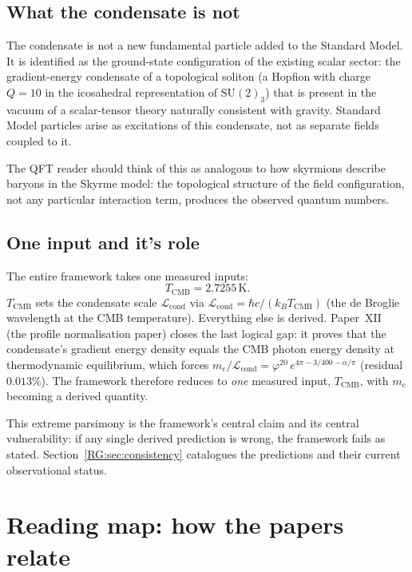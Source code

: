 \documentclass[11pt,a4paper]{article}
\newcommand{\vp}{\varphi}
\newcommand{\TCMB}{T_{\mathrm{CMB}}}
\begin{document}
\subsection{What the condensate is not}

The condensate is not a new fundamental particle added to the Standard Model.
It is identified as the ground-state configuration of the existing scalar sector:
the gradient-energy condensate of a topological soliton (a Hopfion with charge
$Q=10$ in the icosahedral representation of $\mathrm{SU}(2)_3$) that is present
in the vacuum of a scalar-tensor theory naturally consistent with gravity.
Standard Model particles arise as
excitations of this condensate, not as separate fields coupled to it.

The QFT reader should think of this as analogous to how skyrmions describe
baryons in the Skyrme model: the topological structure of the field configuration,
not any particular interaction term, produces the observed quantum numbers.

\subsection{One input and it's role}

The entire framework takes one measured inputs:
\begin{equation}
  \TCMB = 2.7255\,\text{K}.
\end{equation}
$\TCMB$ sets the condensate scale $\mathcal{L}_{\mathrm{cond}}$ via
$\mathcal{L}_{\mathrm{cond}} = \hbar c / (k_B \TCMB)$ (the de Broglie
wavelength at the CMB temperature).
Everything else is derived.
Paper~XII~\cite{Paper12} (the profile normalisation paper) closes the last logical gap:
it proves that the condensate's gradient energy density equals the CMB
photon energy density at thermodynamic equilibrium, which forces
$m_e/\mathcal{L}_{\mathrm{cond}} = \vp^{20}\,e^{4\pi-3/400 -\alpha/\pi}$
(residual $0.013\%$).
The framework therefore reduces to \emph{one} measured input, $\TCMB$,
with $m_e$ becoming a derived quantity.

This extreme parsimony is the framework's central claim and its central
vulnerability: if any single derived prediction is wrong, the framework fails
as stated. Section~\ref{RG:sec:consistency} catalogues the predictions and their
current observational status.

\section{Reading map: how the papers relate}
\end{document}
